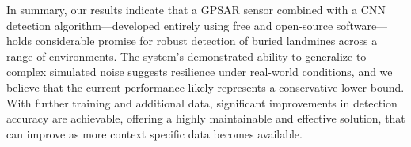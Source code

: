         In summary, our results indicate that a GPSAR sensor combined with a CNN detection algorithm—developed entirely using free and open-source software—holds considerable promise for robust detection of buried landmines across a range of environments. The system's demonstrated ability to generalize to complex simulated noise suggests resilience under real-world conditions, and we believe that the current performance likely represents a conservative lower bound. With further training and additional data, significant improvements in detection accuracy are achievable, offering a highly maintainable and effective solution, that can improve as more context specific data becomes available.